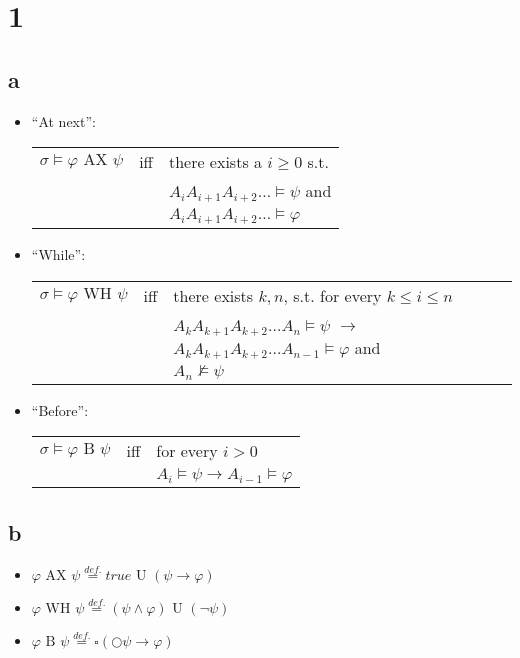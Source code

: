 \documentclass[11pt]{article}
\begin{document}
	
\section{1}
\subsection{a}
\begin{itemize}
\item ``At next'':\\
\begin{tabular}{lcl}
	$\sigma \models \varphi \text{ AX } \psi$ & iff & there exists a $i \ge 0$ s.t.\\
	& & $A_iA_{i+1}A_{i+2} \dots \models \psi$  and \\
	& & $A_iA_{i+1}A_{i+2} \dots \models \varphi$\\
\end{tabular}	 
\item ``While'':\\
\begin{tabular}{lcl}
	$\sigma \models \varphi \text{ WH } \psi$ & iff & there exists $k,n$, s.t. for every $k \le i \le n$ \\
	& & $A_kA_{k+1}A_{k+2} \dots A_{n} \models \psi$ $\rightarrow$ $A_kA_{k+1}A_{k+2} \dots A_{n-1} \models \varphi$ and \\
	& & $A_n \not\models \psi$
\end{tabular}	 

\item ``Before'':\\
\begin{tabular}{lcl}
	$\sigma \models \varphi \text{ B } \psi$ & iff & for every $i > 0$ \\
	& & $A_i \models \psi \rightarrow A_{i-1} \models \varphi$
\end{tabular}

\end{itemize}
\subsection{b}

\begin{itemize}
\item $\varphi \text{ AX }\psi \stackrel{def.}{=} true\text{ U } (\psi \rightarrow \varphi)$
\item $\varphi \text{ WH }\psi \stackrel{def.}{=} (\psi \land \varphi) \text{ U } (\lnot\psi)$
\item $\varphi \text{ B }\psi \stackrel{def.}{=} \square(\bigcirc \psi \rightarrow \varphi)$
\end{itemize}	
\end{document}
